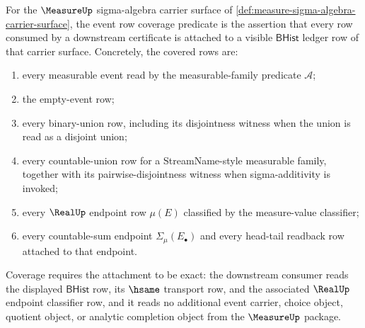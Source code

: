 \begin{definition}
\label{def:measure-event-row-coverage}
For the $\MeasureUp$ sigma-algebra carrier surface of
\autoref{def:measure-sigma-algebra-carrier-surface}, the event row coverage
predicate is the assertion that every row consumed by a downstream certificate
is attached to a visible $\mathsf{BHist}$ ledger row of that carrier surface.
Concretely, the covered rows are:
\begin{enumerate}
  \item every measurable event read by the measurable-family predicate
  $\mathcal{A}$;
  \item the empty-event row;
  \item every binary-union row, including its disjointness witness when the
  union is read as a disjoint union;
  \item every countable-union row for a StreamName-style measurable family,
  together with its pairwise-disjointness witness when sigma-additivity is
  invoked;
  \item every $\RealUp$ endpoint row $\mu(E)$ classified by the measure-value
  classifier;
  \item every countable-sum endpoint $\Sigma_\mu(E_\bullet)$ and every
  head-tail readback row attached to that endpoint.
\end{enumerate}
Coverage requires the attachment to be exact: the downstream consumer reads the
displayed $\mathsf{BHist}$ row, its $\hsame$ transport row, and the associated
$\RealUp$ endpoint classifier row, and it reads no additional event carrier,
choice object, quotient object, or analytic completion object from the
$\MeasureUp$ package.
\end{definition}

